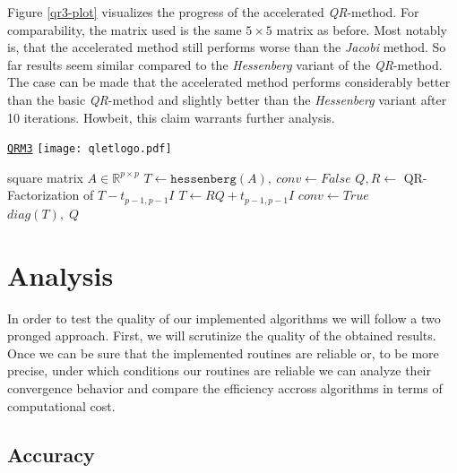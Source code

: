 \documentclass[12pt]{article}
\begin{document}
Figure \ref{qr3-plot} visualizes the progress of the accelerated \textit{QR}-method. For comparability, the matrix used is the same $5 \times 5$ matrix as before. Most notably is, that the accelerated method still performs worse than the \textit{Jacobi} method. So far results seem similar compared to the \textit{Hessenberg} variant of the \textit{QR}-method. The case can be made that the accelerated method performs considerably better than the basic \textit{QR}-method and slightly better than the \textit{Hessenberg} variant after 10 iterations. Howbeit, this claim warrants further analysis.

\begin{algorithm}
\begin{algorithmic}[1]
\caption{\href {https://github.com/thsis/NIS18/blob/master/algorithms/eigen.py}{\texttt{QRM3}}  \protect\texttt{[image: qletlogo.pdf]}}

\Require square matrix $A \in \mathbb{R}^{p \times p}$
\State $T \gets \texttt{hessenberg}(A),\ conv \gets False$
    \State $Q, R \gets$ QR-Factorization of $T - t_{p-1, p-1} I$
    \State $T \gets RQ + t_{p-1, p-1}I$
        \State $conv \gets True$
    \EndIf
\EndWhile\\
\Return $diag\left(T\right),\; Q$
\end{algorithmic}
\end{algorithm}

\section{Analysis}

In order to test the quality of our implemented algorithms we will follow a two pronged approach. First, we will scrutinize the quality of the obtained results. Once we can be sure that the implemented routines are reliable or, to be more precise, under which conditions our routines are reliable we can analyze their convergence behavior and compare the efficiency accross algorithms in terms of computational cost.
\subsection{Accuracy}
\end{document}
